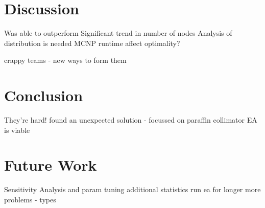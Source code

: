\documentclass[conference]{IEEEtran}
\begin{document}
\section{Discussion}
Was able to outperform
Significant trend in number of nodes
Analysis of distribution is needed
MCNP runtime affect optimality?

crappy teams - new ways to form them

\section{Conclusion}
They're hard!
found an unexpected solution - focussed on paraffin collimator
EA is viable

\section{Future Work}
Sensitivity Analysis and param tuning
additional statistics
run ea for longer
more problems - types


%
%

\end{document}
